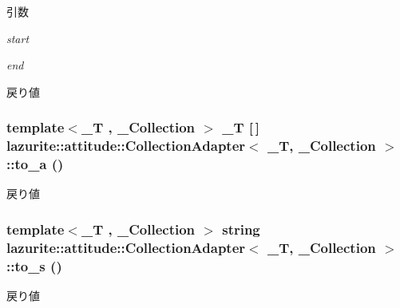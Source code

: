 \begin{DoxyParams}{引数}
\item[{\em start}]\item[{\em end}]\end{DoxyParams}
\begin{DoxyReturn}{戻り値}

\end{DoxyReturn}
\hypertarget{classlazurite_1_1attitude_1_1_collection_adapter_3_01___t_00_01___collection_01_4_a388a36a912ff043859921c36f1ee1552}{
\subsubsection[{to\_\-a}]{\setlength{\rightskip}{0pt plus 5cm}template$<$\_\-T , \_\-Collection $>$ \_\-T \mbox{[}$\,$\mbox{]} lazurite::attitude::CollectionAdapter$<$ \_\-T, \_\-Collection $>$::to\_\-a ()}}
\label{classlazurite_1_1attitude_1_1_collection_adapter_3_01___t_00_01___collection_01_4_a388a36a912ff043859921c36f1ee1552}
\begin{DoxyReturn}{戻り値}

\end{DoxyReturn}
\hypertarget{classlazurite_1_1attitude_1_1_collection_adapter_3_01___t_00_01___collection_01_4_a46d7e822b65077e37a97327b8048c094}{
\subsubsection[{to\_\-s}]{\setlength{\rightskip}{0pt plus 5cm}template$<$\_\-T , \_\-Collection $>$ string lazurite::attitude::CollectionAdapter$<$ \_\-T, \_\-Collection $>$::to\_\-s ()}}
\label{classlazurite_1_1attitude_1_1_collection_adapter_3_01___t_00_01___collection_01_4_a46d7e822b65077e37a97327b8048c094}
\begin{DoxyReturn}{戻り値}

\end{DoxyReturn}
